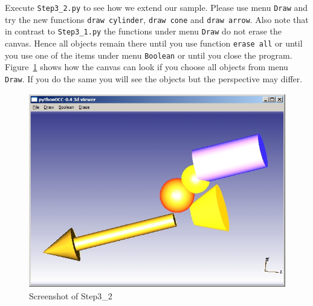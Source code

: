 Execute {\tt Step3\_2.py} to see how we extend our sample.
Please use menu {\tt Draw} and try the new functions {\tt draw cylinder},  {\tt draw cone} and  {\tt draw arrow}.
Also note that in contrast to {\tt Step3\_1.py} the functions under menu {\tt Draw} do not erase the canvas.
Hence all objects remain there until you use function {\tt erase all} or until you use one of the items under menu {\tt Boolean} or until you close the program.
Figure~\ref{STEP_3_2_SCREEN} shows how the canvas can look if you choose all objects from menu {\tt Draw}.
If you do the same you will see the objects but the perspective may differ.
\begin{figure}[h]
\begin{center}
\includegraphics[height=8.5cm,width=11.3cm]{Step3_2.jpg}
\end{center}
\caption[Screenshot of Step3\_2]{\label{STEP_3_2_SCREEN}Screenshot of Step3\_2}
\end{figure}

